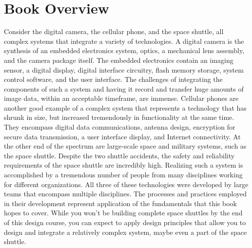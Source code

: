 \section{Book Overview}\label{book-overview}

Consider the digital camera, the cellular phone, and the space shuttle,
all complex systems that integrate a variety of technologies. A digital
camera is the synthesis of an embedded electronics system, optics, a
mechanical lens assembly, and the camera package itself. The embedded
electronics contain an imaging sensor, a digital display, digital
interface circuitry, flash memory storage, system control software, and
the user interface. The challenges of integrating the components of such
a system and having it record and transfer huge amounts of image data,
within an acceptable timeframe, are immense. Cellular phones are another
good example of a complex system that represents a technology that has
shrunk in size, but increased tremendously in functionality at the same
time. They encompass digital data communications, antenna design,
encryption for secure data transmission, a user interface display, and
Internet connectivity. At the other end of the spectrum are large-scale
space and military systems, such as the space shuttle. Despite the two
shuttle accidents, the safety and reliability requirements of the space
shuttle are incredibly high. Realizing such a system is accomplished by
a tremendous number of people from many disciplines working for
different organizations. All three of these technologies were developed
by large teams that encompass multiple disciplines. The processes and
practices employed in their development represent application of the
fundamentals that this book hopes to cover. While you won't be building
complete space shuttles by the end of this design course, you can expect
to apply design principles that allow you to design and integrate a
relatively complex system, maybe even a part of the space shuttle.

